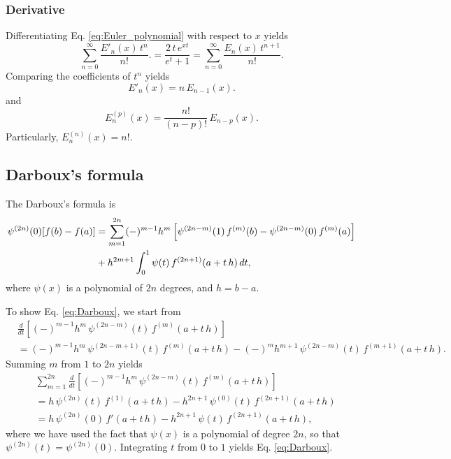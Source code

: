 \documentclass[aip,jcp,preprint,notitlepage, superscriptaddress]{revtex4-1}
\begin{document}
\subsubsection{Derivative}




Differentiating Eq. \eqref{eq:Euler_polynomial}
with respect to $x$ yields
\[
\sum_{n = 0}^\infty \frac{ E'_n(x) \, t^{n} } { n! }.
=
\frac{ 2 \, t \, e^{x t} }
{ e^t + 1 }
=
\sum_{n = 0}^\infty \frac{ E_n(x) \, t^{n + 1} } { n! }.
\]
Comparing the coefficients of $t^n$ yields
\[
E'_n(x)
=
n \, E_{n-1}(x).
\]
and
\begin{equation}
  E^{(p)}_n(x)
=
\frac{n!}{(n-p)!} \, E_{n-p}(x).
\label{eq:dEuler_polynomial}
\end{equation}
Particularly,
$E^{(n)}_n(x) = n!$.




\subsection{Darboux's formula}



The Darboux's formula\cite{
whittaker, wang_specfunc}
is
%
\begin{align}
\psi^{(2n)}(0) [f(b) - f(a)]
&=
\sum_{m = 1}^{2n}
  (-)^{m - 1} h^m
  \left[
    \psi^{(2n - m)}(1) \, f^{(m)}(b)
    -
    \psi^{(2n - m)}(0) \, f^{(m)}(a)
  \right]
\notag \\
&
+h^{2m + 1}
\int_0^1
  \psi(t) \, f^{(2n+1)}(a + t \, h) \, dt,
\label{eq:Darboux}
\end{align}
where
$\psi(x)$ is a polynomial of $2n$ degrees,
and $h = b - a$.



To show Eq. \eqref{eq:Darboux},
we start from
%
\begin{align*}
&\frac{ d } { dt }
\left[
  (-)^{m - 1} h^m \,
  \psi^{(2 n - m)}(t) \, f^{(m)}(a + t \, h)
\right]
\\
&=
(-)^{m-1} h^m \,
  \psi^{(2 n - m + 1)}(t) \, f^{(m)}(a + t \, h)
-
(-)^m h^{m + 1} \,
  \psi^{(2 n - m)}(t) \, f^{(m + 1)}(a + t \, h).
\end{align*}
%
Summing $m$ from $1$ to $2 n$ yields
%
\begin{align*}
&\sum_{m = 1}^{2 n}
\frac{ d } { dt }
  \left[
    (-)^{m - 1} h^m \,
    \psi^{(2 n - m)}(t) \, f^{(m)}(a + t \, h)
  \right]
\\
&=
h \,
  \psi^{(2 n)}(t) \, f^{(1)}(a + t \, h)
-
h^{2 n + 1} \,
  \psi^{(0)}(t) \, f^{(2 n + 1)}(a + t \, h)
\\
&=
h \,
  \psi^{(2 n)}(0) \, f'(a + t \, h)
-
h^{2 n + 1} \,
  \psi(t) \, f^{(2 n + 1)}(a + t \, h),
\end{align*}
%
where
we have used the fact that
$\psi(x)$ is a polynomial of degree $2n$,
so that
$\psi^{(2 n)}(t) = \psi^{(2 n)}(0)$.
%
Integrating $t$ from $0$ to $1$
yields Eq. \eqref{eq:Darboux}.
\end{document}
